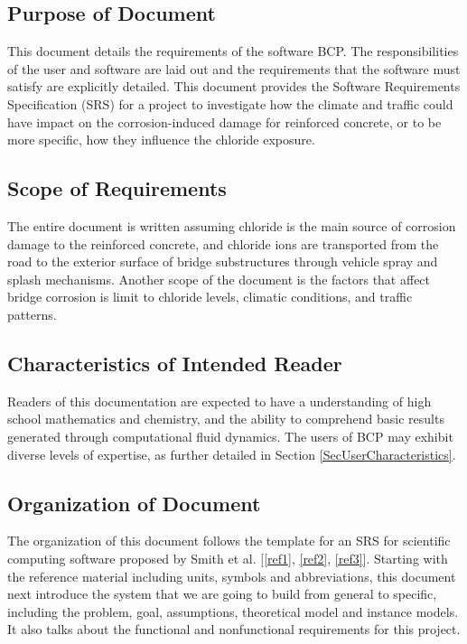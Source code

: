 \documentclass[12pt]{article}
\newcommand{\reref}[1]{\ref{#1}}
\begin{document}
\subsection{Purpose of Document}
This document details the requirements of the software BCP. The
responsibilities of the user and software are laid out and the requirements that the software must satisfy are explicitly detailed. This document provides the Software Requirements Specification (SRS) for a project to investigate how the climate and traffic could have impact on the corrosion-induced damage for reinforced concrete, or to be more specific, how they influence the chloride exposure. 

\subsection{Scope of Requirements} 
The entire document is written assuming chloride is the main source of corrosion damage to the reinforced concrete, and chloride ions are transported from the road to the exterior surface of bridge substructures through vehicle spray and splash mechanisms. Another scope of the document is the factors that affect bridge corrosion is limit to chloride levels, climatic conditions, and traffic patterns. %

\subsection{Characteristics of Intended Reader} \label{sec_IntendedReader}
Readers of this documentation are expected to have a understanding of high school mathematics and chemistry, and the ability to comprehend basic results generated through computational fluid dynamics. The users of BCP may exhibit diverse levels of expertise, as further detailed in Section \ref{SecUserCharacteristics}.

\subsection{Organization of Document}
The organization of this document follows the template for an SRS for scientific computing software proposed by Smith et al. [\reref{ref1}, \reref{ref2}, \reref{ref3}]. Starting with the reference material including units, symbols and abbreviations, this document next introduce the system that we are going to build from general to specific, including the problem, goal, assumptions, theoretical model and instance models. It also talks about the functional and nonfunctional requirements for this project.
\end{document}

